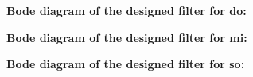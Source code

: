 \documentclass[a4paper, 12pt]{article}
\begin{document}
\begin{itemize}
\pagebreak
\begin{tcolorbox}[enforce breakable, pad at break = 1mm, break at=25cm,title={Source Code}]

\end{tcolorbox}

\textbf{Bode diagram of the designed filter for do:}
\begin{figure}[h!]
\end{figure}

\pagebreak
\textbf{Bode diagram of the designed filter for mi:}
\begin{figure}[h!]
\end{figure}

\textbf{Bode diagram of the designed filter for so:}
\begin{figure}[h!]
\end{figure}


\end{itemize}
\end{document}
